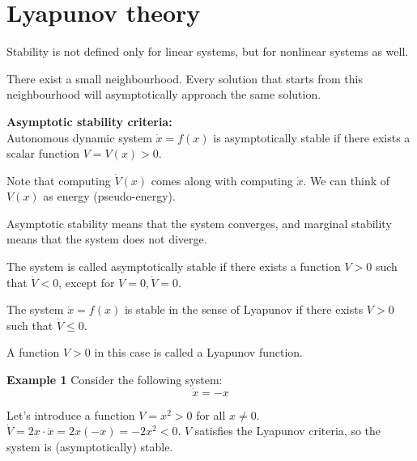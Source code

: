 \section{Lyapunov theory}

Stability is not defined only for linear systems, but for nonlinear systems as well.

There exist a small neighbourhood. Every solution that starts from this neighbourhood will asymptotically approach the same solution. 

\textbf{Asymptotic stability criteria:}\\
Autonomous dynamic system $\dot x = f(x)$ is asymptotically stable if there exists a scalar function $V = V(x) > 0$. 


Note that computing $\dot V(x)$ comes along with computing $\dot x$. 
We can think of $V(x)$ as energy (pseudo-energy).

Asymptotic stability means that the system converges, and marginal stability means that the system does not diverge. 


\begin{tcolorbox}[colback=blue!10,colframe=blue!50!black,title=\textbf{Asymptotic stability}]
The system is called asymptotically stable if there exists a function $V > 0$ such that $\dot{V} < 0$, except for $V = 0, \dot{V} = 0$. 
\end{tcolorbox}

\begin{tcolorbox}[colback=green!10,colframe=green!50!black,title=\textbf{Marginal stability}]
The system $\dot{x} = f(x)$ is stable in the sense of Lyapunov if there exists $V > 0$ such that $\dot{V} \leq 0$. 
\end{tcolorbox}

\begin{tcolorbox}[colback=red!10,colframe=red!50!black,title=\textbf{Lyapunov function}]
A function $V > 0$ in this case is called a Lyapunov function. 
\end{tcolorbox}



\textbf{Example 1}
Consider the following system:
\[\dot{x} = -x\]

Let's introduce a function $V = x^2 > 0$ for all $x \neq 0$. $\dot{V} = 2x \cdot \dot{x} = 2x (-x) = -2x^2 < 0$. 
$V$ satisfies the Lyapunov criteria, so the system is (asymptotically) stable. 


